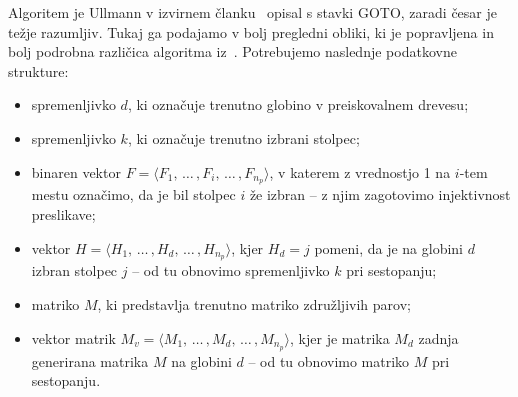 \documentclass[a4paper, 12pt, ]{book}
\begin{document}
	Algoritem je Ullmann v izvirnem članku~\cite{ullmann} opisal s stavki GOTO, zaradi česar je težje razumljiv. Tukaj ga podajamo v bolj pregledni obliki,
	ki je popravljena in bolj podrobna različica algoritma iz~\cite{zampelli-th}. Potrebujemo naslednje podatkovne strukture:
	\begin{itemize}
		\item spremenljivko $d$, ki označuje trenutno globino v preiskovalnem drevesu;
		\item spremenljivko $k$, ki označuje trenutno izbrani stolpec;
		\item binaren vektor $F = \langle F_1, \,\ldots \, , F_i, \,\ldots \, ,  F_{n_p} \rangle $, v katerem z vrednostjo 1 na $i$-tem mestu označimo, 
			da je bil stolpec $i$ že izbran -- z njim zagotovimo injektivnost preslikave;
		\item vektor $H = \langle H_1, \,\ldots \, , H_d, \,\ldots \, , H_{n_p} \rangle $, kjer $H_d = j$ pomeni, da je na globini $d$ izbran stolpec $j$ --
			od tu obnovimo spremenljivko $k$ pri sestopanju;
		\item matriko $M$, ki predstavlja trenutno matriko združljivih parov;
		\item vektor matrik $M_v = \langle M_1, \,\ldots \, , M_d, \,\ldots \, , M_{n_p} \rangle $, kjer je matrika $M_d$ zadnja generirana matrika $M$
			na globini $d$ -- od tu obnovimo matriko $M$ pri sestopanju.
	\end{itemize}
\end{document}
